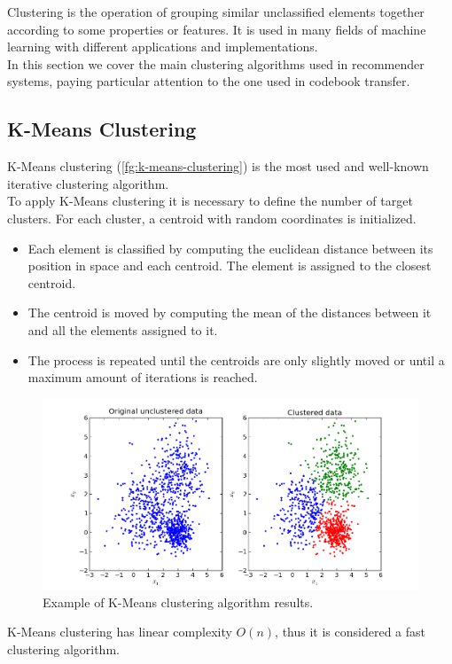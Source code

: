 Clustering is the operation of grouping similar unclassified elements together according to some properties or features. It is used in many fields of machine learning with different applications and implementations.\\
In this section we cover the main clustering algorithms used in recommender systems, paying particular attention to the one used in codebook transfer.


\subsection{K-Means Clustering}

K-Means clustering (\autoref{fg:k-means-clustering}) is the most used and well-known iterative clustering algorithm.\\
To apply K-Means clustering it is necessary to define the number of target clusters. For each cluster, a centroid with random coordinates is initialized.
\begin{itemize}
\item Each element is classified by computing the euclidean distance between its position in space and each centroid. The element is assigned to the closest centroid.
\item The centroid is moved by computing the mean of the distances between it and all the elements assigned to it.
\item The process is repeated until the centroids are only slightly moved or until a maximum amount of iterations is reached.
\end{itemize}
\begin{figure}[hbt]
\centering
\includegraphics[width=\textwidth]{pictures/k-means-clustering}
\caption{Example of K-Means clustering algorithm results.}
\label{fg:k-means-clustering}
\end{figure}
K-Means clustering has linear complexity $O(n)$, thus it is considered a fast clustering algorithm.


